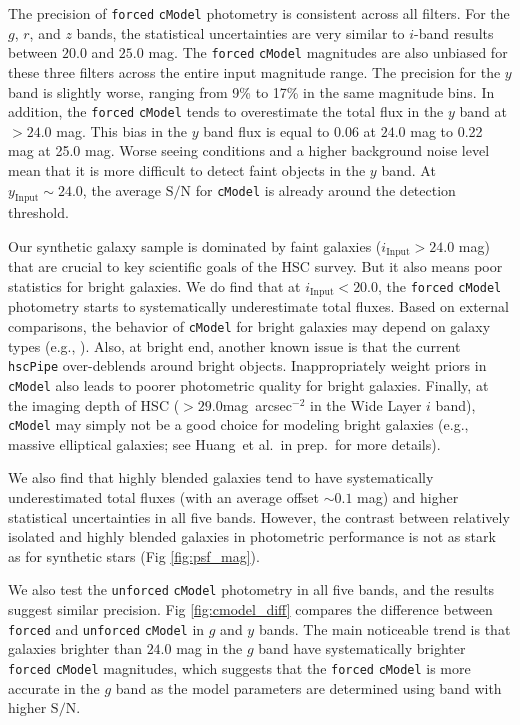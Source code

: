 \documentclass[useamsfonts]{pasj01}
\def\sb{mag~arcsec$^{-2}$}
\def\etal{{\ et al.~}}
\def\hscpipe{\texttt{hscPipe}}
\def\cmodel{\texttt{cModel}}
\def\forced{\texttt{forced}}
\def\unforced{\texttt{unforced}}
\def\s2n{{$\mathrm{S}/\mathrm{N}$}}
\newcommand{\minus}{\raisebox{.4\height}{\scalebox{.8}{-}}}
\begin{document}
    The precision of \forced{} \cmodel{} photometry is consistent across all filters.
    For the $g$, $r$, and $z$ bands, the statistical uncertainties are very similar to
    $i$-band results between $20.0$ and $25.0$ mag.
    The \forced{} \cmodel{} magnitudes are also unbiased for these three filters
    across the entire input magnitude range.
    The precision for the $y$ band is slightly worse, ranging from 9\% to 17\% in the
    same magnitude bins.
    In addition, the \forced{} \cmodel{} tends to overestimate the total flux in 
    the $y$ band at $>24.0$ mag. 
    This bias in the $y$ band flux is equal to \minus{}0.06 at $24.0$ mag to 
    \minus{}0.22 mag at 25.0 mag. 
    Worse seeing conditions and a higher background noise level mean that it is more
    difficult to detect faint objects in the $y$ band.
    At $y_{\mathrm{Input}}{\sim}24.0$, the average \s2n{} for \cmodel{} is already
    around the detection threshold.

    Our synthetic galaxy sample is dominated by faint galaxies 
    ($i_{\mathrm{Input}} > 24.0$ mag) that are crucial to key scientific goals of the 
    HSC survey.
    But it also means poor statistics for bright galaxies. 
    We do find that at $i_{\mathrm{Input}}<20.0$, the \forced{} \cmodel{} photometry 
    starts to systematically underestimate total fluxes. 
    Based on external comparisons, the behavior of \cmodel{} for bright galaxies may 
    depend on galaxy types (e.g., \citealt{HSCDR1}).  
    Also, at bright end, another known issue is that the current \hscpipe{}
    over-deblends around bright objects. 
    Inappropriately weight priors in \cmodel{} also leads to poorer photometric 
    quality for bright galaxies.  
    Finally, at the imaging depth of HSC ($>29.0$\sb{} in the Wide Layer $i$ band),  
    \cmodel{} may simply not be a good choice for modeling bright galaxies 
    (e.g., massive elliptical galaxies; see Huang\etal in prep.~for more details).

    We also find that highly blended galaxies tend to have systematically 
    underestimated total fluxes (with an average offset ${\sim}0.1$ mag) and 
    higher statistical uncertainties in all five bands. 
    However, the contrast between relatively isolated and highly blended galaxies
    in photometric performance is not as stark as for synthetic stars 
    (Fig \ref{fig:psf_mag}).

    We also test the \unforced{} \cmodel{} photometry in all five bands, and the
    results suggest similar precision.
    Fig \ref{fig:cmodel_diff} compares the difference between \forced{} and \unforced{} 
    \cmodel{} in $g$ and $y$ bands.  
    The main noticeable trend is that galaxies brighter than $24.0$ mag in the $g$ band 
    have systematically brighter \forced{} \cmodel{} magnitudes, which suggests that 
    the \forced{} \cmodel{} is more accurate in the $g$ band as the model parameters 
    are determined using band with higher \s2n{}.
    
\end{document}
